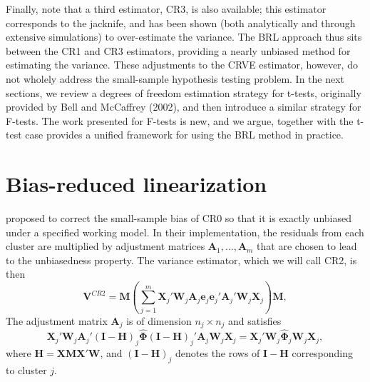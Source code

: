 \documentclass[12pt]{article}\usepackage[]{graphicx}\usepackage[]{color}
\newcommand{\bm}{\mathbf}
\newcommand{\bs}{\boldsymbol}
\begin{document}
Finally, note that a third estimator, CR3, is also available; this estimator corresponds to the jacknife, and has been shown (both analytically and through extensive simulations) to over-estimate the variance. The BRL approach thus sits between the CR1 and CR3 estimators, providing a nearly unbiased method for estimating the variance. These adjustments to the CRVE estimator, however, do not wholely address the small-sample hypothesis testing problem. In the next sections, we review a degrees of freedom estimation strategy for t-tests, originally provided by Bell and McCaffrey (2002), and then introduce a similar strategy for F-tests. The work presented for F-tests is new, and we argue, together with the t-test case provides a unified framework for using the BRL method in practice. 

\section{Bias-reduced linearization}

\citet[see also \citealp{Bell2002bias}]{McCaffrey2001generalizations} proposed to correct the small-sample bias of CR0 so that it is exactly unbiased under a specified working model. 
In their implementation, the residuals from each cluster are multiplied by adjustment matrices $\bm{A}_1,...,\bm{A}_m$ that are chosen to lead to the unbiasedness property. 
The variance estimator, which we will call CR2, is then 
\begin{equation}
\label{eq:V_CR2}
\bm{V}^{CR2} = \bm{M}\left(\sum_{j=1}^m \bm{X}_j'\bm{W}_j \bm{A}_j \bm{e}_j \bm{e}_j' \bm{A}_j' \bm{W}_j \bm{X}_j\right) \bm{M},
\end{equation}
The adjustment matrix $\bm{A}_j$ is of dimension $n_j \times n_j$ and satisfies
\begin{equation}
\label{eq:CR2_criterion}
\bm{X}_j' \bm{W}_j \bm{A}_j' \left(\bm{I} - \bm{H}\right)_j \hat{\bs\Phi} \left(\bm{I} - \bm{H}\right)_j' \bm{A}_j \bm{W}_j \bm{X}_j = \bm{X}_j' \bm{W}_j \hat{\bs\Phi}_j \bm{W}_j \bm{X}_j,
\end{equation}
where $\bm{H} = \bm{X}\bm{M}\bm{X}'\bm{W}$, and $\left(\bm{I} - \bm{H}\right)_j$ denotes the rows of $\bm{I} - \bm{H}$ corresponding to cluster $j$. 
\end{document}
